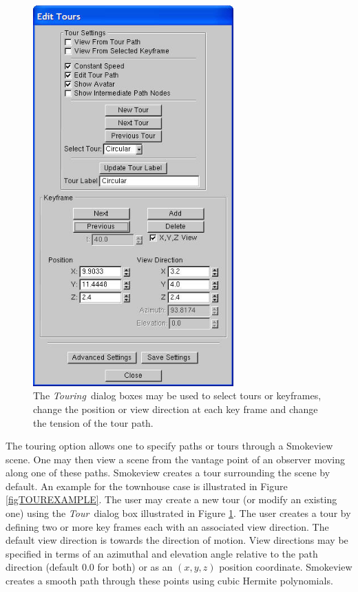 \documentclass[11pt,twoside]{book}
\begin{document}
\begin{figure}[\figoptions]
\begin{center}
\includegraphics[width=3.0277777in]{FIGURES/figTOUR}
\end{center}
\caption[{\em Touring}\ dialog boxes.]{The {\em Touring}\ dialog
boxes may be used to select tours or keyframes, change the
position or view direction at each key frame and change the tension
of the tour path. }
 \label{figTOUR}
\end{figure}

The touring option allows one to specify paths or tours through a
Smokeview scene.  One may then view a scene from the vantage point of an
observer moving along one of these paths. Smokeview creates a tour surrounding
the scene by default.  An example for the townhouse case is illustrated
in Figure \ref{figTOUREXAMPLE}.
The user may create a new tour (or modify an existing one) using the {\em Tour}\
dialog box illustrated in Figure \ref{figTOUR}. The user creates a tour by
defining two or more key frames each with an associated view direction.
The default view direction is towards the direction of
motion.  View directions may be specified in terms of an azimuthal and elevation angle relative to the path direction (default 0.0 for both) or as an $(x,y,z)$ position coordinate.  Smokeview creates a smooth path through these points using cubic Hermite polynomials.
\end{document}
